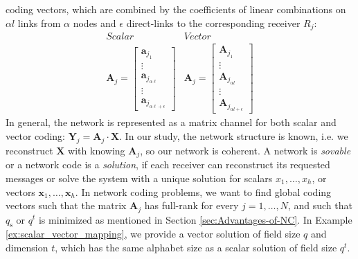 coding vectors, which are combined by the coefficients of linear combinations
on $\alpha l$ links from $\alpha$ nodes and $\epsilon$ direct-links
to the corresponding receiver $R_{j}$:
\[
\begin{array}{c|c}
Scalar & Vector\\
\boldsymbol{A}_{j}=\left[\begin{array}{c}
\boldsymbol{a}_{j_{1}}\\
\vdots\\
\boldsymbol{a}_{j_{\alpha\ell}}\\
\vdots\\
\boldsymbol{a}_{j_{\alpha\ell+\epsilon}}
\end{array}\right] & \boldsymbol{A}_{j}=\left[\begin{array}{c}
\boldsymbol{A}_{j_{1}}\\
\vdots\\
\boldsymbol{A}_{j_{\alpha l}}\\
\vdots\\
\boldsymbol{A}_{j_{\alpha l+\epsilon}}
\end{array}\right]
\end{array}
\]
In general, the network is represented as a matrix channel for both
scalar and vector coding: $\boldsymbol{Y}_{j}=\boldsymbol{A}_{j}\cdot\boldsymbol{X}$.
In our study, the network structure is known, i.e. we reconstruct
$\boldsymbol{X}$ with knowing $\boldsymbol{A}_{j}$, so our network
is coherent. A network is \textit{sovable} or a network code is a
\textit{solution}, if each receiver can reconstruct its requested
messages or solve the system with a unique solution for scalars $x_{1},\ldots,x_{h}$,
or vectors $\boldsymbol{x}_{1},\ldots,\boldsymbol{x}_{h}$. In network
coding problems, we want to find global coding vectors such that the
matrix $\boldsymbol{A}_{j}$ has full-rank for every $j=1,\ldots,N$,
and such that $q_{\mathrm{s}}$ or $q^{t}$ is minimized as mentioned
in Section \ref{sec:Advantages-of-NC}. In Example \ref{ex:scalar_vector_mapping},
we provide a vector solution of field size $q$ and dimension $t$,
which has the same alphabet size as a scalar solution of field size
$q^{t}$.

